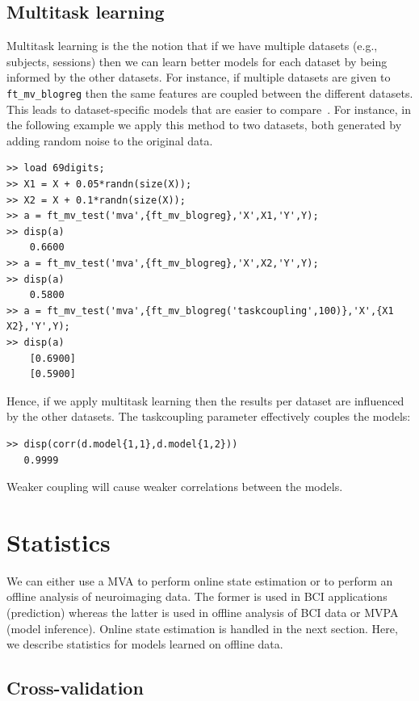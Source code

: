 \documentclass{article}
\renewcommand{\t}[1]{{\tt #1}}
\begin{document}
\subsection{Multitask learning}

Multitask learning is the the notion that if we have multiple datasets (e.g., subjects, sessions) then we can learn better models for each dataset by being informed by the other datasets. For instance, if multiple datasets are given to \t{ft\_mv\_blogreg} then the same features are coupled between the different datasets. This leads to dataset-specific models that are easier to compare~\cite{gerven2010b}. For instance, in the following example we apply this method to two datasets, both generated by adding random noise to the original data.
\begin{verbatim}
>> load 69digits;
>> X1 = X + 0.05*randn(size(X));
>> X2 = X + 0.1*randn(size(X));
>> a = ft_mv_test('mva',{ft_mv_blogreg},'X',X1,'Y',Y);
>> disp(a)
    0.6600
>> a = ft_mv_test('mva',{ft_mv_blogreg},'X',X2,'Y',Y);
>> disp(a)
    0.5800
>> a = ft_mv_test('mva',{ft_mv_blogreg('taskcoupling',100)},'X',{X1 X2},'Y',Y);
>> disp(a)
    [0.6900]
    [0.5900]
\end{verbatim}
Hence, if we apply multitask learning then the results per dataset are influenced by the other datasets. The taskcoupling parameter effectively couples the models:
\begin{verbatim}
>> disp(corr(d.model{1,1},d.model{1,2}))
   0.9999
\end{verbatim}
Weaker coupling will cause weaker correlations between the models.
\section{Statistics}

We can either use a MVA to perform online state estimation or to perform an offline analysis of neuroimaging data. The former is used in BCI applications (prediction) whereas the latter is used in offline analysis of BCI data or MVPA (model inference). Online state estimation is handled in the next section. Here, we describe statistics for models learned on offline data.

\subsection{Cross-validation}
\end{document}
